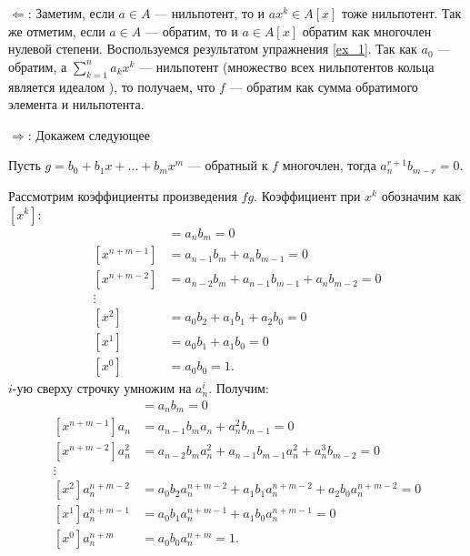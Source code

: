     \begin{Proof}

        $\Leftarrow$: Заметим, если $a \in A$ --- нильпотент, то и $ax^k \in A[x]$ тоже нильпотент. Так же отметим, если $a \in A$ --- обратим, 
        то и $a \in A[x]$ обратим как многочлен нулевой степени.
        Воспользуемся результатом упражнения \ref{ex_1}. Так как $a_0$ --- обратим, а $\sum_{k = 1}^n a_kx^k$ --- нильпотент (множество всех нильпотентов кольца является идеалом \cite{A-M}), то получаем, что
        $f$ --- обратим как сумма обратимого элемента и нильпотента.

        $\Rightarrow$: Докажем следующее 
        \begin{Statement}
            Пусть $g = b_0 + b_1x + \dots + b_mx^m$ --- обратный к $f$ многочлен, тогда $a_n^{r + 1}b_{m - r} = 0$.
        \end{Statement}
        \begin{Proof}
            Рассмотрим коэффициенты произведения $fg$. Коэффициент при $x^k$ обозначим как $[x^k]$:
            \begin{align*}
                [x^{n + m}]&=a_nb_m = 0\\
                [x^{n + m - 1}]&= a_{n - 1}b_m + a_nb_{m - 1} = 0 \\
                [x^{n + m - 2}]&= a_{n - 2}b_m + a_{n - 1}b_{m - 1} + a_nb_{m - 2} = 0\\
                \vdots\\
                [x^2]&= a_0b_2 + a_1b_1 + a_2b_0 = 0\\
                [x^1]&=a_0b_1 + a_1b_0 = 0 \\
                [x^0]&=a_0b_0 = 1.
            \end{align*}
            $i$-ую сверху строчку умножим на $a_n^i$. Получим:
            \begin{align*}
                [x^{n + m}]&=a_nb_m = 0\\
                [x^{n + m - 1}]a_n&= a_{n - 1}b_ma_n + a_n^2b_{m - 1} = 0 \\
                [x^{n + m - 2}]a_n^2&= a_{n - 2}b_ma_n^2 + a_{n - 1}b_{m - 1}a_n^2 + a_n^3b_{m - 2} = 0\\
                \vdots\\
                [x^2]a_n^{n + m - 2}&= a_0b_2a_n^{n + m - 2} + a_1b_1a_n^{n + m - 2} + a_2b_0a_n^{n + m - 2} = 0\\
                [x^1]a_n^{n + m - 1}&=a_0b_1a_n^{n + m - 1} + a_1b_0a_n^{n + m - 1} = 0 \\
                [x^0]a_n^{n + m}&=a_0b_0a_n^{n + m} = 1.
            \end{align*}


\end{Proof}
\end{Proof}
